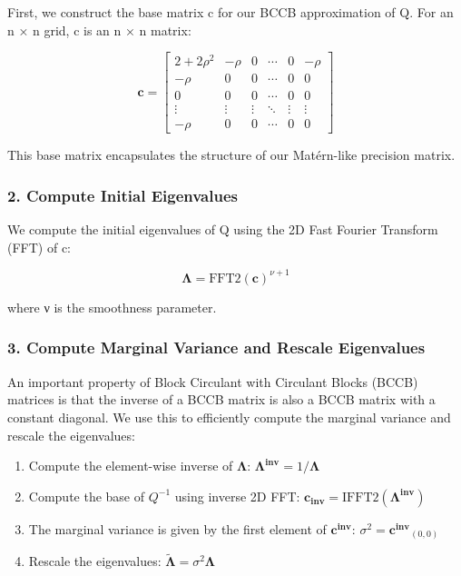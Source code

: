 \documentclass[journal=,manuscript=]{achemso}
\providecommand{\tightlist}{%
  \setlength{\itemsep}{0pt}\setlength{\parskip}{0pt}}\usepackage{longtable,booktabs,array}
\begin{document}
First, we construct the base matrix c for our BCCB approximation of Q.
For an n × n grid, c is an n × n matrix:

\[
\mathbf{c} = \begin{bmatrix}
2+2\rho^2 & -\rho & 0 & \cdots & 0 & -\rho \\
-\rho & 0 & 0 & \cdots & 0 & 0 \\
0 & 0 & 0 & \cdots & 0 & 0 \\
\vdots & \vdots & \vdots & \ddots & \vdots & \vdots \\
-\rho & 0 & 0 & \cdots & 0 & 0
\end{bmatrix}
\]

This base matrix encapsulates the structure of our Matérn-like precision
matrix.

\subsubsection{2. Compute Initial
Eigenvalues}\label{compute-initial-eigenvalues}

We compute the initial eigenvalues of Q using the 2D Fast Fourier
Transform (FFT) of c:

\[
\boldsymbol{\Lambda} = \text{FFT2}(\mathbf{c})^{\nu+1}
\]

where ν is the smoothness parameter.

\subsubsection{3. Compute Marginal Variance and Rescale
Eigenvalues}\label{compute-marginal-variance-and-rescale-eigenvalues}

An important property of Block Circulant with Circulant Blocks (BCCB)
matrices is that the inverse of a BCCB matrix is also a BCCB matrix with
a constant diagonal. We use this to efficiently compute the marginal
variance and rescale the eigenvalues:

\begin{enumerate}
\def\labelenumi{\alph{enumi}.}
\tightlist
\item
  Compute the element-wise inverse of \(\boldsymbol{\Lambda}\):
  \(\mathbf{\Lambda^{inv}} = 1 / \boldsymbol{\Lambda}\)
\item
  Compute the base of \(Q^{-1}\) using inverse 2D FFT:
  \(\mathbf{c_{inv}} = \text{IFFT2}(\mathbf{{\Lambda^{inv}}})\)
\item
  The marginal variance is given by the first element of
  \(\mathbf{c^{inv}}\): \(\sigma^2 = \mathbf{c^{inv}}_{(0,0)}\)
\item
  Rescale the eigenvalues:
  \(\boldsymbol{\widetilde \Lambda} = \sigma^2 \boldsymbol{\Lambda}\)
\end{enumerate}
\end{document}
